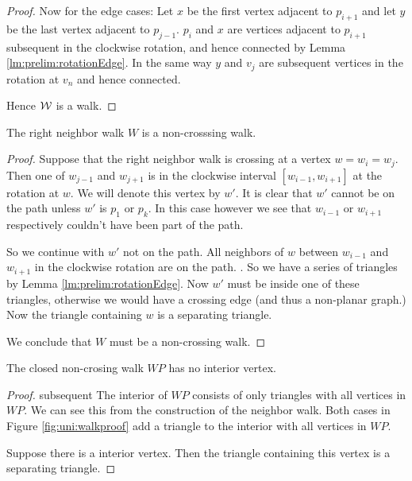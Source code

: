 \begin{proof}
      Now for the edge cases: Let $x$ be the first vertex adjacent to $p_{i+1}$ and let $y$ be the last vertex adjacent to $p_{j-1}$. $p_i$ and $x$ are vertices adjacent to $p_{i+1}$ subsequent in the clockwise rotation, and hence connected by Lemma \ref{lm:prelim:rotationEdge}. In the same way $y$ and $v_j$ are subsequent vertices in the rotation at $v_n$ and hence connected.

      Hence $\mathcal{W}$ is a walk.
    \end{proof}


    \begin{lemma}
      \label{lm:uni:neighborWalkNoncrossing}
      The right neighbor walk $W$ is a non-crosssing walk.
    \end{lemma}
    \begin{proof}
      Suppose that the right neighbor walk is crossing at a vertex $w= w_i =w_j$. Then one of $w_{j-1}$ and $w_{j+1}$ is in the clockwise interval $[w_{i-1}, w_{i+1} ]$ at the rotation at $w$. We will denote this vertex by $w'$. It is clear that $w'$ cannot be on the path unless $w'$ is $p_1$ or $p_k$. In this case however we see that $w_{i-1}$ or $w_{i+1}$ respectively couldn't have been part of the path.

      So we continue with $w'$ not on the path. All neighbors of $w$ between $w_{i-1}$ and $w_{i+1}$ in the clockwise rotation are on the path. . So we have a series of triangles by Lemma \ref{lm:prelim:rotationEdge}. Now $w'$ must be inside one of these triangles, otherwise we would have a crossing edge (and thus a non-planar graph.) Now the triangle containing $w$ is a separating triangle.

      We conclude that $W$ must be a non-crossing walk.
    \end{proof}


    \begin{lemma}
      \label{lm:uni:neighbourwalkNoInteriorVertex}
      The closed non-crosing walk $WP$ has no interior vertex.
    \end{lemma}
    \begin{proof}subsequent
      The interior of $WP$ consists of only triangles with all vertices in $WP$. We can see this from the construction of the neighbor walk. Both cases in Figure \ref{fig:uni:walkproof} add a triangle to the interior with all vertices in $WP$.

      Suppose there is a interior vertex. Then the triangle containing this vertex is a separating triangle.
    \end{proof}


